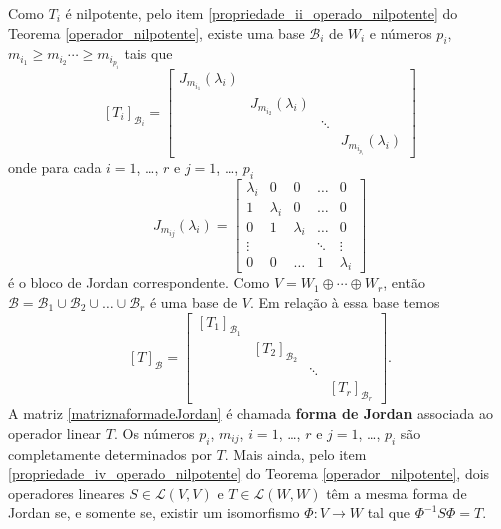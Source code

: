 Como $T_i$ \'e nilpotente, pelo item \ref{propriedade_ii_operado_nilpotente} do Teorema \ref{operador_nilpotente}, existe uma base $\mathcal{B}_i$ de $W_i$ e n\'umeros $p_i$, $m_{i_1} \ge m_{i_2} \cdots \ge m_{i_{p_i}}$ tais que
\[
    [T_i]_{\mathcal{B}_i} = \begin{bmatrix}
        J_{m_{i_1}}(\lambda_i)\\
        & J_{m_{i_2}}(\lambda_i)\\
         & & \ddots\\
        & & & J_{m_{i_{p_i}}}(\lambda_i)
    \end{bmatrix}
\]
onde para cada $i = 1$, \dots, $r$ e $j = 1$, \dots, $p_i$
\[
    J_{m_{ij}}(\lambda_i) = \begin{bmatrix}
        \lambda_i & 0 & 0 & \dots & 0\\
        1 & \lambda_i & 0 & \dots & 0\\
        0 & 1 & \lambda_i & \dots & 0\\
        \vdots& & & \ddots & \vdots\\
        0 & 0 & \dots & 1 & \lambda_i
    \end{bmatrix}
\]
\'e o bloco de Jordan correspondente. Como $V = W_1 \oplus \cdots \oplus W_r$, ent\~ao $\mathcal{B} = \mathcal{B}_1 \cup \mathcal{B}_2 \cup \dots \cup \mathcal{B}_r$ \'e uma base de $V$. Em rela\c{c}\~ao \`a essa base temos
\begin{equation}\label{matriznaformadeJordan}
    [T]_\mathcal{B} = \begin{bmatrix}
        [T_1]_{\mathcal{B}_1}\\
        & [T_2]_{\mathcal{B}_2}\\
        & & \ddots\\
        & & & [T_r]_{\mathcal{B}_r}
    \end{bmatrix}.
\end{equation}
A matriz \eqref{matriznaformadeJordan} \'e chamada \textbf{forma de Jordan} associada ao operador linear $T$. Os n\'umeros $p_i$, $m_{ij}$, $i = 1$, \dots, $r$ e $j = 1$, \dots, $p_i$ s\~ao completamente determinados por $T$. Mais ainda, pelo item \ref{propriedade_iv_operado_nilpotente} do Teorema \ref{operador_nilpotente}, dois operadores lineares $S \in \mathcal{L}(V,V)$ e $T \in \mathcal{L}(W,W)$ t\^em a mesma forma de Jordan se, e somente se, existir um isomorfismo $\Phi : V \to W$ tal que $\Phi^{-1}S\Phi = T$.

